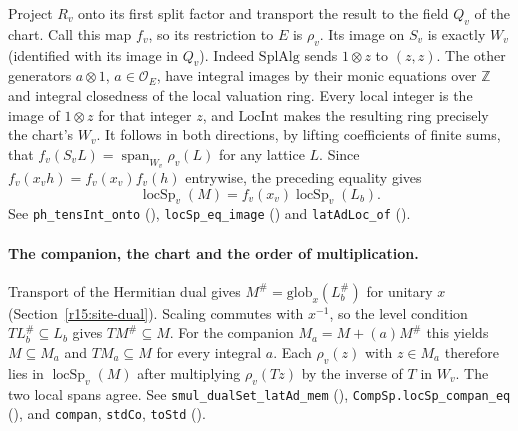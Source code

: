 Project $R_v$ onto its first split factor and transport the result to
the field $Q_v$ of the chart. Call this map $f_v$, so its restriction
to $E$ is $\rho_v$. Its image on $S_v$ is exactly $W_v$ (identified
with its image in $Q_v$). Indeed $\mathrm{SplAlg}$ sends $1\otimes z$
to $(z,z)$. The other generators $a\otimes1$, $a\in\mathcal O_E$,
have integral images by their monic equations over $\mathbb Z$ and
integral closedness of the local valuation ring. Every local integer
is the image of $1\otimes z$ for that integer $z$, and $\mathrm{LocInt}$
makes the resulting ring precisely the chart's $W_v$. It follows
in both directions, by lifting coefficients of finite sums, that
$f_v(S_vL)=\operatorname{span}_{W_v}\rho_v(L)$ for any lattice $L$.
Since $f_v(x_vh)=f_v(x_v)f_v(h)$ entrywise, the preceding equality gives
\[
 \operatorname{locSp}_v(M)=f_v(x_v)\operatorname{locSp}_v(L_b).
\]
See \nolinkurl{ph_tensInt_onto}
(),
\nolinkurl{locSp_eq_image} ()
and \nolinkurl{latAdLoc_of} ().

\paragraph{The companion, the chart and the order of multiplication.}
\label{r15:span-frame}
Transport of the Hermitian dual gives $M^\#=\mathrm{glob}_x(L_b^\#)$
for unitary $x$ (Section~\ref{r15:site-dual}). Scaling commutes with
$x^{-1}$, so the level condition $T L_b^\#\subseteq L_b$ gives
$T M^\#\subseteq M$. For the companion $M_a=M+(a)M^\#$ this yields
$M\subseteq M_a$ and $T M_a\subseteq M$ for every integral $a$.
Each $\rho_v(z)$ with $z\in M_a$ therefore lies in
$\operatorname{locSp}_v(M)$ after multiplying $\rho_v(Tz)$ by the
inverse of $T$ in $W_v$. The two local spans agree. See
\nolinkurl{smul_dualSet_latAd_mem}
(),
\nolinkurl{CompSp.locSp_compan_eq}
(),
and \nolinkurl{compan}, \nolinkurl{stdCo}, \nolinkurl{toStd}
().

